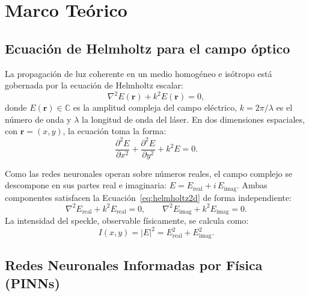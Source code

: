 
\section{Marco Teórico}
\label{sec:teoria}

\subsection{Ecuación de Helmholtz para el campo óptico}
\label{subsec:helmholtz}

La propagación de luz coherente en un medio homogéneo e isótropo está gobernada
por la ecuación de Helmholtz escalar:
%
\begin{equation}
  \nabla^2 E(\mathbf{r}) + k^2 E(\mathbf{r}) = 0,
  \label{eq:helmholtz}
\end{equation}
%
donde $E(\mathbf{r}) \in \mathbb{C}$ es la amplitud compleja del campo eléctrico,
$k = 2\pi/\lambda$ es el número de onda y $\lambda$ la longitud de onda del láser.
En dos dimensiones espaciales, con $\mathbf{r} = (x, y)$, la ecuación toma la forma:
%
\begin{equation}
  \frac{\partial^2 E}{\partial x^2} + \frac{\partial^2 E}{\partial y^2} + k^2 E = 0.
  \label{eq:helmholtz2d}
\end{equation}

Como las redes neuronales operan sobre números reales, el campo complejo se descompone
en sus partes real e imaginaria: $E = E_{\mathrm{real}} + i\,E_{\mathrm{imag}}$.
Ambas componentes satisfacen la Ecuación~\eqref{eq:helmholtz2d} de forma independiente:
%
\begin{equation}
  \nabla^2 E_{\mathrm{real}} + k^2 E_{\mathrm{real}} = 0, \qquad
  \nabla^2 E_{\mathrm{imag}} + k^2 E_{\mathrm{imag}} = 0.
  \label{eq:helmholtz_split}
\end{equation}
%
La intensidad del speckle, observable físicamente, se calcula como:
%
\begin{equation}
  I(x,y) = |E|^2 = E_{\mathrm{real}}^2 + E_{\mathrm{imag}}^2.
  \label{eq:intensidad}
\end{equation}

\subsection{Redes Neuronales Informadas por Física (PINNs)}
\label{subsec:pinns}

